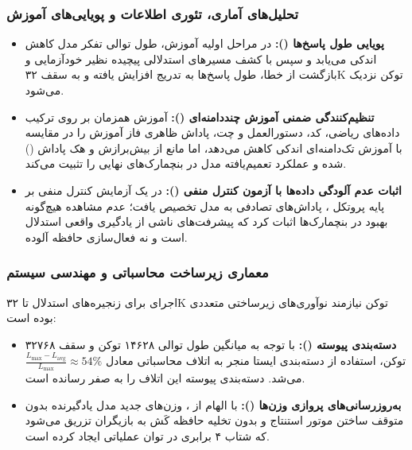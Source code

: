 \subsubsection*{تحلیل‌های آماری، تئوری اطلاعات و پویایی‌های آموزش}

\begin{itemize}
    \item \textbf{پویایی طول پاسخ‌ها ():} در مراحل اولیه آموزش، طول توالی تفکر مدل کاهش اندکی می‌یابد و سپس با کشف مسیرهای استدلالی پیچیده نظیر خودآزمایی و بازگشت از خطا، طول پاسخ‌ها به تدریج افزایش یافته و به سقف ۳۲K توکن نزدیک می‌شود.
    \item \textbf{تنظیم‌کنندگی ضمنی آموزش چنددامنه‌ای ():} آموزش همزمان بر روی ترکیب داده‌های ریاضی، کد، دستورالعمل و چت، پاداش ظاهری فاز آموزش را در مقایسه با آموزش تک‌دامنه‌ای اندکی کاهش می‌دهد، اما مانع از بیش‌برازش و هک پاداش () شده و عملکرد تعمیم‌یافته مدل در بنچمارک‌های نهایی را تثبیت می‌کند.
    \item \textbf{اثبات عدم آلودگی داده‌ها با آزمون کنترل منفی ():} در یک آزمایش کنترل منفی بر پایه پروتکل \cite{shao2025spurious}، پاداش‌های تصادفی به مدل تخصیص یافت؛ عدم مشاهده هیچ‌گونه بهبود در بنچمارک‌ها اثبات کرد که پیشرفت‌های  ناشی از یادگیری واقعی استدلال است و نه فعال‌سازی حافظه آلوده.
\end{itemize}

\subsubsection*{معماری زیرساخت محاسباتی و مهندسی سیستم}

اجرای  برای زنجیره‌های استدلال تا ۳۲K توکن نیازمند نوآوری‌های زیرساختی متعددی بوده است:
\begin{itemize}
    \item \textbf{دسته‌بندی پیوسته ():} با توجه به میانگین طول توالی ۱۴۶۲۸ توکن و سقف ۳۲۷۶۸ توکن، استفاده از دسته‌بندی ایستا منجر به اتلاف محاسباتی معادل $\frac{L_{\text{max}} - L_{\text{avg}}}{L_{\text{max}}} \approx 54\%$ می‌شد. دسته‌بندی پیوسته این اتلاف را به صفر رسانده است.
    \item \textbf{به‌روزرسانی‌های پروازی وزن‌ها ():} با الهام از  \cite{piche2025pipelinerl}، وزن‌های جدید مدل یادگیرنده بدون متوقف ساختن موتور استنتاج و بدون تخلیه حافظه کَش  به بازیگران تزریق می‌شود که شتاب ۴ برابری در توان عملیاتی ایجاد کرده است.
\end{itemize}

